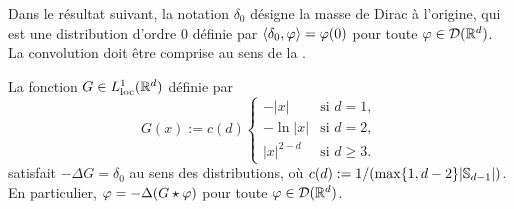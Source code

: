 Dans le résultat suivant, la notation $\delta_0$ désigne la masse de Dirac à l'origine, qui est une distribution d'ordre $0$ définie par $\langle\delta_0,\varphi\rangle = \varphi(0)$ pour toute $\varphi \in \mathcal{D}(\mathbb{R}^d)$. La convolution doit être comprise au sens de la .

\begin{corollary}
\label{corol:noyauGreen}
%
La fonction $G \in L^1_{\mathrm{loc}}(\mathbb{R}^d)$ définie par
\begin{equation*}
	G(x) := c(d)
	\begin{cases}
	-|x| &\text{si } d=1,\\
	- \ln |x| &\text{si } d=2,\\
	|x|^{2-d} & \text{si } d\geq 3.
	\end{cases}
\end{equation*}
satisfait $-\Delta G = \delta_0$ au sens des distributions, où $c(d) := 1/(\max \{1,d-2\} |\mathbb{S}_{d-1}|)$. 
En particulier, $\varphi = -\Delta (G \star \varphi)$ pour toute $\varphi \in \mathcal{D}(\mathbb{R}^d)$. 
\end{corollary}

